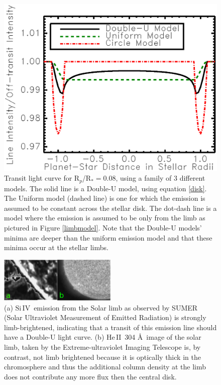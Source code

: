 \documentclass[manuscript]{aastex}
\newcommand{\heII}{\ensuremath{\mathrm{He}\,\scriptstyle \mathrm{II}}}
\newcommand{\siIV}{\ensuremath{\mathrm{Si}\,\scriptstyle \mathrm{IV}}}
\newcommand{\p}{R$_p$/R$_*$}
\begin{document}
\begin{figure}
\begin{center}
\includegraphics[width=0.5 \textwidth]{model_compare2.eps}
\caption{Transit light curve for \p $=0.08$, using a family of 3 different models. The solid line is a Double-U model, using equation \ref{disk}. The Uniform model (dashed line) is one for which the emission is assumed to be constant across the stellar disk. The dot-dash line is a model where the emission is assumed to be only from the limb as pictured in Figure \ref{limbmodel}. Note that the Double-U models' minima are deeper than the uniform emission model and that these minima occur at the stellar limbs. }
\end{center}
\label{fig02}
\end{figure}

\begin{figure}
\begin{center}
\includegraphics[width=0.5\textwidth]{limb_compare_siIV_heII.eps}
\caption{(a) \siIV\ emission from the Solar limb as observed by SUMER (Solar Ultraviolet Measurement of Emitted Radiation) \citep{wiik} is strongly limb-brightened, indicating that a transit of this emission line should have a Double-U light curve. (b) \heII\ 304 \AA\ image of the solar limb, taken by the Extreme-ultraviolet Imaging Telescope \citep{feldman} is, by contrast, not limb brightened because it is optically thick in the chromosphere and thus the additional column density at the limb does not contribute any more flux then the central disk.}
\label{limbs}
\end{center}
\end{figure}
\end{document}
